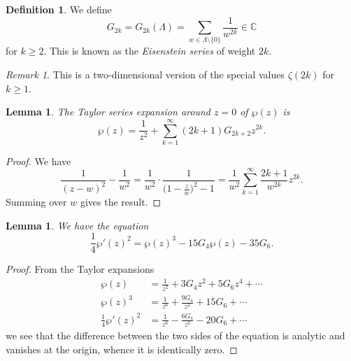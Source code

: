 \documentclass[a4paper]{article}
\theoremstyle{plain}
\newtheorem{lemma}[theorem]{Lemma}
\theoremstyle{remark}
\newtheorem*{remark}{Remark}
\theoremstyle{definition}
\newtheorem*{definition}{Definition}
\newcommand{\C}{\mathbb{C}}
\begin{document}
\begin{definition}
    We define
    \begin{equation*}
        G_{2k} = G_{2k}(\Lambda)
            = \sum_{w\in\Lambda\setminus\{0\}}\frac{1}{w^{2k}} \in \C
    \end{equation*}
    for $k\ge2$. This is known as the \emph{Eisenstein series} of weight $2k$.
\end{definition}

\begin{remark}
    This is a two-dimensional version of the special values $\zeta(2k)$ for
    $k\ge1$.
\end{remark}

\begin{lemma}
    The Taylor series expansion around $z=0$ of $\wp(z)$ is
    \begin{equation*}
        \wp(z) = \frac{1}{z^2} + \sum_{k=1}^\infty(2k+1)G_{2k+2}z^{2k}.
    \end{equation*}
\end{lemma}

\begin{proof}
    We have
    \begin{equation*}
        \frac{1}{(z-w)^2} - \frac{1}{w^2}
            = \frac{1}{w^2}\cdot\frac{1}{\bigl(1-\frac{z}{w}\bigr)^2-1}
            = \frac{1}{w^2}\sum_{k=1}^\infty\frac{2k+1}{w^{2k}}z^{2k}.
    \end{equation*}
    Summing over $w$ gives the result.
\end{proof}

\begin{lemma}
    We have the equation
    \begin{equation*}
        \frac{1}{4}\wp'(z)^2 = \wp(z)^3 - 15G_4\wp(z) - 35G_6.
    \end{equation*}
\end{lemma}

\begin{proof}
    From the Taylor expansions
    \begin{align*}
        \wp(z) &= \frac{1}{z^2} + 3G_4z^2 + 5G_6z^4 + \cdots \\
        \wp(z)^3 &= \frac{1}{z^6} + \frac{9G_4}{z^2} + 15G_6 + \cdots \\
        \frac{1}{4}\wp'(z)^2 &= \frac{1}{z^6} - \frac{6G_4}{z^2} - 20G_6 + \cdots
    \end{align*}
    we see that the difference between the two sides of the equation is analytic
    and vanishes at the origin, whence it is identically zero.
\end{proof}
\end{document}
